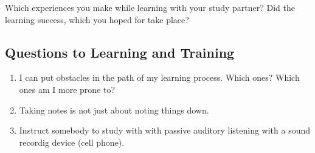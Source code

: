\documentclass[../main.tex]{subfiles}
\begin{document}
Which experiences you make while learning with your study partner?
Did the learning success, which you hoped for take place?

\subsection{Questions to Learning and Training}
\begin{enumerate}
\item I can put obstacles in the path of my learning process. Which ones? Which ones am I more prone to?
\item Taking notes is not just about noting things down.
  \item Instruct somebody to study with with passive auditory listening with a sound recordig device (cell phone).
  \end{enumerate}
\end{document}
